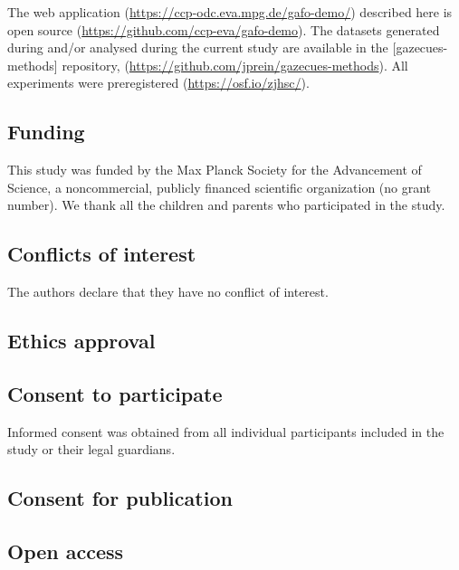 \documentclass[
  man,floatsintext]{apa6}
\begin{document}
The web application (\url{https://ccp-odc.eva.mpg.de/gafo-demo/}) described here is open source (\url{https://github.com/ccp-eva/gafo-demo}).
The datasets generated during and/or analysed during the current study are available in the {[}gazecues-methods{]} repository, (\url{https://github.com/jprein/gazecues-methods}). All experiments were preregistered (\url{https://osf.io/zjhsc/}).

\hypertarget{funding}{%
\subsection{Funding}\label{funding}}

This study was funded by the Max Planck Society for the Advancement of Science, a noncommercial, publicly financed scientific organization (no grant number). We thank all the children and parents who participated in the study.

\hypertarget{conflicts-of-interest}{%
\subsection{Conflicts of interest}\label{conflicts-of-interest}}

The authors declare that they have no conflict of interest.

\hypertarget{ethics-approval}{%
\subsection{Ethics approval}\label{ethics-approval}}

\hypertarget{consent-to-participate}{%
\subsection{Consent to participate}\label{consent-to-participate}}

Informed consent was obtained from all individual participants included in the study or their legal guardians.

\hypertarget{consent-for-publication}{%
\subsection{Consent for publication}\label{consent-for-publication}}

\hypertarget{open-access}{%
\subsection{Open access}\label{open-access}}
\end{document}
